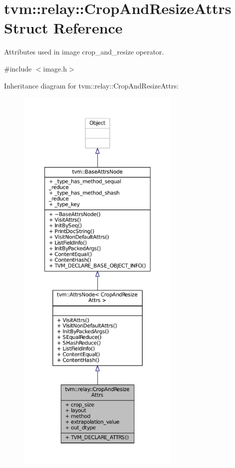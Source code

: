 \hypertarget{structtvm_1_1relay_1_1CropAndResizeAttrs}{}\section{tvm\+:\+:relay\+:\+:Crop\+And\+Resize\+Attrs Struct Reference}
\label{structtvm_1_1relay_1_1CropAndResizeAttrs}


Attributes used in image crop\+\_\+and\+\_\+resize operator.  




{\ttfamily \#include $<$image.\+h$>$}



Inheritance diagram for tvm\+:\+:relay\+:\+:Crop\+And\+Resize\+Attrs\+:
\nopagebreak
\begin{figure}[H]
\begin{center}
\leavevmode
\includegraphics[height=550pt]{structtvm_1_1relay_1_1CropAndResizeAttrs__inherit__graph}
\end{center}
\end{figure}


